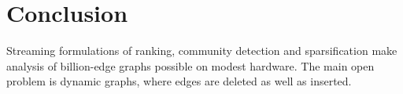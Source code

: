 \chapter{Conclusion}
\label{ch:conclusion}

Streaming formulations of ranking, community detection and sparsification make analysis of
billion-edge graphs possible on modest hardware. The main open problem is dynamic graphs, where
edges are deleted as well as inserted.
